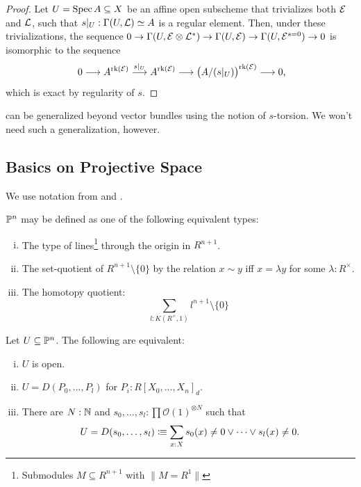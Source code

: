 \begin{proof}
  Let $U = \operatorname{Spec} A \subseteq X$ be an affine open subscheme that trivializes both $\mathcal{E}$ and $\mathcal{L}$, such that $s|_U: \Gamma(U,\mathcal{L}) \simeq A$ is a regular element.
  Then, under these trivializations, the sequence $0 \to \Gamma(U,\mathcal{E} \otimes \mathcal{L}^\ast) \to \Gamma(U, \mathcal{E}) \to \Gamma(U,\mathcal{E}^{s=0}) \to 0$ is isomorphic to the sequence
  \[
    0 \longrightarrow A^{\rk(\mc E)}
    \overset{s|_U}{\longrightarrow} A^{\rk(\mc E)}
    \longrightarrow \big( A/(s|_U) \big)^{\rk(\mc E)}
      \longrightarrow 0 \rlap{,}
  \]
  which is exact by regularity of $s$.
\end{proof}

\begin{remark}
   can be generalized beyond vector bundles using the notion of $s$-torsion.
  We won't need such a generalization, however.
\end{remark}





\subsection{Basics on Projective Space}

We use notation from \cite{draft} and \cite{sag-projective}.

\begin{definition}
  \label{Pn-definitions}
  $\mathbb{P}^n$ may be defined as one of the following equivalent types:
  \begin{enumerate}[(i)]
  \item The type of lines\footnote{Submodules $M\subseteq R^{n+1}$ with $\| M=R^1 \|$} through the origin in $R^{n+1}$.
  \item The set-quotient of $R^{n+1}\setminus\{0\}$ by the relation $x\sim y$ iff $x=\lambda y$ for some $\lambda :R^\times$.
  \item\label{Pn-as-homotopy-quotient} The homotopy quotient:
    \[
      \sum_{l : K(R^\times,1)} l^{n+1}\setminus\{0\}
    \]
  \end{enumerate}
\end{definition}

\begin{lemma}
  \label{D-for-Pn}
  Let $U\subseteq \mathbb{P}^n$.
  The following are equivalent:
  \begin{enumerate}[(i)]
  \item $U$ is open.
  \item $U=D(P_0,\dots,P_l)$ for $P_i:R[X_0,\dots,X_n]_d$.
  \item There are $N:\mathbb{N}$ and $s_0,\dots,s_l:\prod \mathcal O(1)^{\otimes N}$ such that
    \[
      U=D(s_0,\dots,s_l)\colonequiv\sum_{x:X}s_0(x)\neq 0\vee \dots \vee s_l(x)\neq 0
      \rlap{.}
    \]
  \end{enumerate}
\end{lemma}

